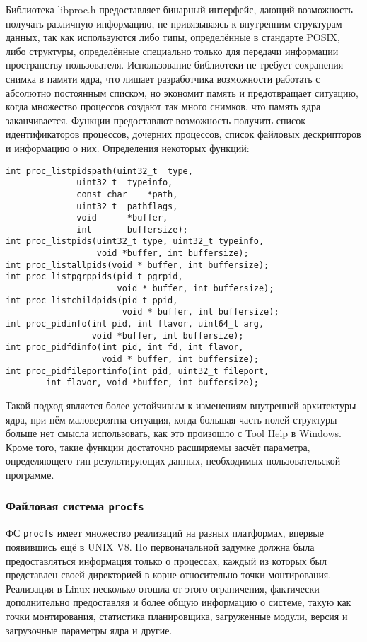 Библиотека libproc.h предоставляет бинарный интерфейс, дающий возможность получать
различную информацию, не привязываясь к внутренним структурам данных, так как
используются либо типы, определённые в стандарте POSIX, либо структуры,
определённые специально только для передачи информации пространству
пользователя\cite{libproc}. Использование библиотеки не требует сохранения
снимка в памяти ядра, что лишает разработчика возможности работать с абсолютно
постоянным списком, но экономит память и предотвращает ситуацию, когда множество
процессов создают так много снимков, что память ядра заканчивается. Функции
предоставлют возможность получить список идентификаторов процессов, дочерних
процессов, список файловых дескрипторов и информацию о них. Определения
некоторых функций:

\medskip
\begin{lstlisting}[style=cstyle]
int	proc_listpidspath(uint32_t	type,
			  uint32_t	typeinfo,
			  const char	*path,
			  uint32_t	pathflags,
			  void		*buffer,
			  int		buffersize);
int proc_listpids(uint32_t type, uint32_t typeinfo,
                  void *buffer, int buffersize);
int proc_listallpids(void * buffer, int buffersize);
int proc_listpgrppids(pid_t pgrpid,
                      void * buffer, int buffersize);
int proc_listchildpids(pid_t ppid,
                       void * buffer, int buffersize);
int proc_pidinfo(int pid, int flavor, uint64_t arg,
                 void *buffer, int buffersize);
int proc_pidfdinfo(int pid, int fd, int flavor,
                   void * buffer, int buffersize);
int proc_pidfileportinfo(int pid, uint32_t fileport,
        int flavor, void *buffer, int buffersize);
\end{lstlisting}
\medskip

Такой подход является более устойчивым к изменениям внутренней архитектуры ядра,
при нём маловероятна ситуация, когда большая часть полей структуры больше нет
смысла использовать, как это произошло с Tool Help в Windows. Кроме того, такие
функции достаточно расширяемы засчёт параметра, определяющего тип результирующих
данных, необходимых пользовательской программе.

\subsubsection{Файловая система \texttt{procfs}}
\label{sub:domain:analogs:procfs}

ФС \texttt{procfs} имеет множество реализаций на разных платформах, впервые
появившись ещё в UNIX V8. По первоначальной задумке должна была предоставляться
информация только о процессах, каждый из которых был представлен своей
директорией в корне относительно точки монтирования. Реализация в Linux
несколько отошла от этого ограничения, фактически дополнительно предоставляя и
более общую информацию о системе, такую как точки монтирования, статистика
планировщика, загруженные модули, версия и загрузочные параметры ядра и
другие\cite{rlove}.

